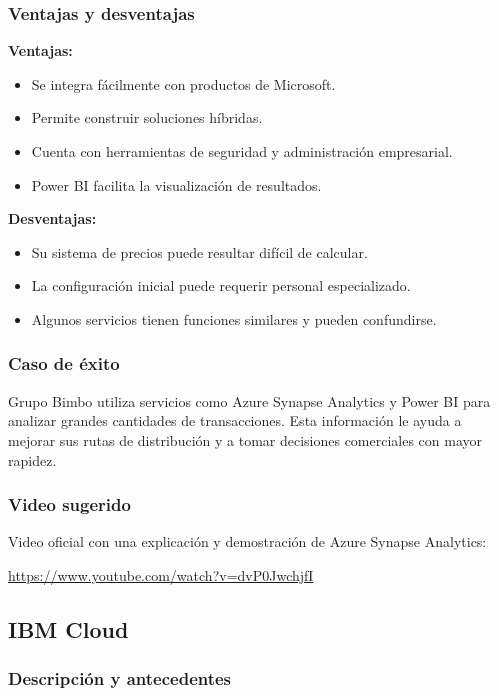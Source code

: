 \subsubsection*{Ventajas y desventajas}

\textbf{Ventajas:}

\begin{itemize}
    \item Se integra fácilmente con productos de Microsoft.
    \item Permite construir soluciones híbridas.
    \item Cuenta con herramientas de seguridad y administración empresarial.
    \item Power BI facilita la visualización de resultados.
\end{itemize}

\textbf{Desventajas:}

\begin{itemize}
    \item Su sistema de precios puede resultar difícil de calcular.
    \item La configuración inicial puede requerir personal especializado.
    \item Algunos servicios tienen funciones similares y pueden confundirse.
\end{itemize}

\subsubsection*{Caso de éxito}

Grupo Bimbo utiliza servicios como Azure Synapse Analytics y Power BI para
analizar grandes cantidades de transacciones. Esta información le ayuda a
mejorar sus rutas de distribución y a tomar decisiones comerciales con mayor
rapidez.

\subsubsection*{Video sugerido}

Video oficial con una explicación y demostración de Azure Synapse Analytics:

\url{https://www.youtube.com/watch?v=dvP0JwchjfI}


\subsection{IBM Cloud}

\subsubsection*{Descripción y antecedentes}

